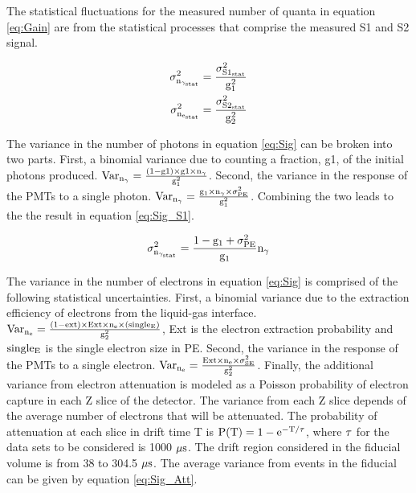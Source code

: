 The statistical fluctuations for the measured number of quanta in equation \ref{eq:Gain} are from the statistical processes that comprise the measured S1 and S2 signal.

\begin{equation}
\begin{split}
\rm  \sigma_{n_{\gamma_{stat}}}^2 = \frac{\sigma_{S1_{stat}}^2}{g_1^2}\\
\rm \sigma_{n_{e_{stat}}}^2 = \frac{\sigma_{S2_{stat}}^2}{g_2^2}
\label{eq:Sig}
\end{split}
\end{equation}

The variance in the number of photons in equation \ref{eq:Sig} can be broken into two parts. First, a binomial variance due to counting a fraction, g1, of the initial photons produced. $\rm Var_{n_\gamma} = \frac{(1-g1)\times g1\times n_\gamma}{g_1^2}$. Second, the variance in the response of the PMTs to a single photon. $\rm Var_{n_\gamma} = \frac{g_1\times n_\gamma \times \sigma_{PE}^2}{g_1^2}$. Combining the two leads to the the result in equation \ref{eq:Sig_S1}.

\begin{equation}
\rm  \sigma_{n_{\gamma_{stat}}}^2 = \frac{1-g_1+\sigma_{PE}^2}{g_1} n_\gamma\\
\label{eq:Sig_S1}
\end{equation}


The variance in the number of electrons in equation \ref{eq:Sig} is comprised of the following statistical uncertainties. First, a binomial variance due to the extraction efficiency of electrons from the liquid-gas interface. $\rm Var_{n_e} = \frac{(1-ext)\times Ext\times n_e \times(single_E)}{g_2^2}$, Ext is the electron extraction probability and $\rm single_E$ is the single electron size in PE. Second, the variance in the response of the PMTs to a single electron. $\rm Var_{n_e} = \frac{Ext\times n_e \times \sigma_{SE}^2}{g_2^2}$. Finally, the additional variance from electron attenuation is modeled as a Poisson probability of electron capture in each Z slice of the detector. The variance from each Z slice depends of the average number of electrons that will be attenuated. The probability of attenuation at each slice in drift time T is $\rm P(T)= 1-e^{-T/\tau}$, where $\rm \tau$ for the data sets to be considered is 1000 $\rm \mu s$. The drift region considered in the fiducial volume is from 38 to 304.5 $\rm \mu s$. The average variance from events in the fiducial can be given by equation \ref{eq:Sig_Att}.

